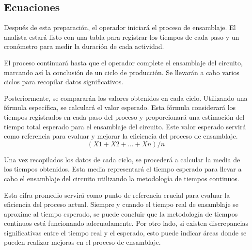     \subsection{Ecuaciones}
    
    Después de esta preparación, el operador iniciará el proceso de ensamblaje. El analista estará listo con una tabla para registrar los tiempos de cada paso y un cronómetro para medir la duración de cada actividad.
    
    El proceso continuará hasta que el operador complete el ensamblaje del circuito, marcando así la conclusión de un ciclo de producción. Se llevarán a cabo varios ciclos para recopilar datos significativos.
    
    Posteriormente, se compararán los valores obtenidos en cada ciclo. Utilizando una fórmula específica, se calculará el valor esperado. Esta fórmula considerará los tiempos registrados en cada paso del proceso y proporcionará una estimación del tiempo total esperado para el ensamblaje del circuito. Este valor esperado servirá como referencia para evaluar y mejorar la eficiencia del proceso de ensamblaje.
    \begin{equation}
        \label{eq1}
         (X1+X2+...+Xn)/n 
    \end{equation}
    
    Una vez recopilados los datos de cada ciclo, se procederá a calcular la media de los tiempos obtenidos. Esta media representará el tiempo esperado para llevar a cabo el ensamblaje del circuito utilizando la metodología de tiempos continuos.
    
    Esta cifra promedio servirá como punto de referencia crucial para evaluar la eficiencia del proceso actual. Siempre y cuando el tiempo real de ensamblaje se aproxime al tiempo esperado, se puede concluir que la metodología de tiempos continuos está funcionando adecuadamente. Por otro lado, si existen discrepancias significativas entre el tiempo real y el esperado, esto puede indicar áreas donde se pueden realizar mejoras en el proceso de ensamblaje.
    
